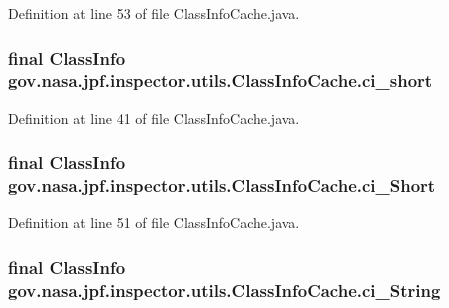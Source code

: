 Definition at line 53 of file Class\+Info\+Cache.\+java.

\subsubsection[{\texorpdfstring{ci\+\_\+short}{ci_short}}]{\setlength{\rightskip}{0pt plus 5cm}final Class\+Info gov.\+nasa.\+jpf.\+inspector.\+utils.\+Class\+Info\+Cache.\+ci\+\_\+short}\hypertarget{classgov_1_1nasa_1_1jpf_1_1inspector_1_1utils_1_1_class_info_cache_aab8276cce884ee34fa1db91fc2d9bccf}{}\label{classgov_1_1nasa_1_1jpf_1_1inspector_1_1utils_1_1_class_info_cache_aab8276cce884ee34fa1db91fc2d9bccf}


Definition at line 41 of file Class\+Info\+Cache.\+java.

\subsubsection[{\texorpdfstring{ci\+\_\+\+Short}{ci_Short}}]{\setlength{\rightskip}{0pt plus 5cm}final Class\+Info gov.\+nasa.\+jpf.\+inspector.\+utils.\+Class\+Info\+Cache.\+ci\+\_\+\+Short}\hypertarget{classgov_1_1nasa_1_1jpf_1_1inspector_1_1utils_1_1_class_info_cache_ab263ad66c64d7712f1835cb8e4914171}{}\label{classgov_1_1nasa_1_1jpf_1_1inspector_1_1utils_1_1_class_info_cache_ab263ad66c64d7712f1835cb8e4914171}


Definition at line 51 of file Class\+Info\+Cache.\+java.

\subsubsection[{\texorpdfstring{ci\+\_\+\+String}{ci_String}}]{\setlength{\rightskip}{0pt plus 5cm}final Class\+Info gov.\+nasa.\+jpf.\+inspector.\+utils.\+Class\+Info\+Cache.\+ci\+\_\+\+String}\hypertarget{classgov_1_1nasa_1_1jpf_1_1inspector_1_1utils_1_1_class_info_cache_ae730b1780420d1f2632fd9a3ffa360c1}{}\label{classgov_1_1nasa_1_1jpf_1_1inspector_1_1utils_1_1_class_info_cache_ae730b1780420d1f2632fd9a3ffa360c1}


